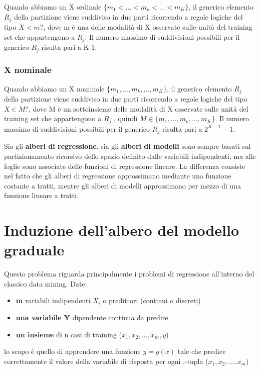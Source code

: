 \documentclass[a4paper]{extarticle}
\begin{document}
Quando abbiamo un X ordinale $\{m_1 < \dots < m_k < \dots <m_K \}$, il generico elemento $R_j$ della partizione viene suddiviso in due parti ricorrendo a regole logiche del tipo $X<m?$, dove m è una delle modalità di X osservate sulle unità del training set che appartengono a $R_j$. Il numero massimo di suddivisioni possibili per il generico $R_j$ risulta pari a K-1.

\subsubsection{X nominale}

Quando abbiamo un X nominale $\{m_1,\dots, m_k,\dots, m_K \}$, il generico elemento $R_j$ della partizione viene suddiviso in due parti ricorrendo a regole logiche del tipo $X \in M ?$, dove M è un sottoinsieme delle modalità di X osservate sulle unità del training set che appartengono a $R_j$ , quindi $M \in \{m_1,\dots, m_k,\dots, m_K \}$. Il numero massimo di suddivisioni possibili per il generico $R_j$ risulta pari a $2^{K-1}-1$.

Sia gli \textbf{alberi di regressione}, sia gli \textbf{alberi di modelli} sono sempre basati sul partizionamento ricorsivo dello spazio definito dalle variabili indipendenti, ma alle foglie sono associate delle funzioni di regressione lineare. La differenza consiste nel fatto che gli alberi di regressione approssimano mediante una funzione costante a tratti, mentre gli alberi di modelli approssimano per mezzo di una funzione lineare a tratti.

\section{Induzione dell'albero del modello graduale}

Questo problema riguarda principalmente i problemi di regressione all'interno del classico data mining. Date:

\begin{itemize}
\item \textbf{m} variabili indipendenti $X_i$ o predittori (continui o discreti)
\item \textbf{una variabile Y} dipendente continua da predire
\item \textbf{un insieme} di n casi di training ($x_1,x_2,\dots,x_m,y$)
\end{itemize}

lo scopo è quello di apprendere una funzione $y=g(x)$ tale che predice correttamente il valore della variabile di risposta per ogni ,-tupla ($x_1,x_2,\dots,x_m$)
\end{document}
